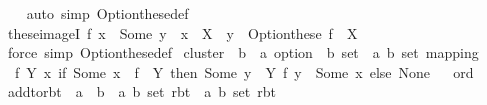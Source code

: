 \begin{isabellebody}
%
\isadelimproof
\ \ %
\endisadelimproof
%
\isatagproof
{}\isamarkupfalse%
\ {\isacharparenleft}{\kern0pt}auto\ simp{\isacharcolon}{\kern0pt}\ Option{\isachardot}{\kern0pt}these{\isacharunderscore}{\kern0pt}def{\isacharparenright}{\kern0pt}%
\endisatagproof
{\isafoldproof}%
%
\isadelimproof
\isanewline
%
\endisadelimproof
\isanewline
{}\isamarkupfalse%
\ these{\isacharunderscore}{\kern0pt}imageI{\isacharcolon}{\kern0pt}\ {\isachardoublequoteopen}f\ x\ {\isacharequal}{\kern0pt}\ Some\ y\ {\isasymLongrightarrow}\ x\ {\isasymin}\ X\ {\isasymLongrightarrow}\ y\ {\isasymin}\ Option{\isachardot}{\kern0pt}these\ {\isacharparenleft}{\kern0pt}f\ {\isacharbackquote}{\kern0pt}\ X{\isacharparenright}{\kern0pt}{\isachardoublequoteclose}\isanewline
%
\isadelimproof
\ \ %
\endisadelimproof
%
\isatagproof
{}\isamarkupfalse%
\ {\isacharparenleft}{\kern0pt}force\ simp{\isacharcolon}{\kern0pt}\ Option{\isachardot}{\kern0pt}these{\isacharunderscore}{\kern0pt}def{\isacharparenright}{\kern0pt}%
\endisatagproof
{\isafoldproof}%
%
\isadelimproof
\isanewline
%
\endisadelimproof
\isanewline
{}\isamarkupfalse%
\ cluster\ {\isacharcolon}{\kern0pt}{\isacharcolon}{\kern0pt}\ {\isachardoublequoteopen}{\isacharparenleft}{\kern0pt}{\isacharprime}{\kern0pt}b\ {\isasymRightarrow}\ {\isacharprime}{\kern0pt}a\ option{\isacharparenright}{\kern0pt}\ {\isasymRightarrow}\ {\isacharprime}{\kern0pt}b\ set\ {\isasymRightarrow}\ {\isacharparenleft}{\kern0pt}{\isacharprime}{\kern0pt}a{\isacharcomma}{\kern0pt}\ {\isacharprime}{\kern0pt}b\ set{\isacharparenright}{\kern0pt}\ mapping{\isachardoublequoteclose}\ \isanewline
\ \ {\isachardoublequoteopen}{\isasymlambda}f\ Y\ x{\isachardot}{\kern0pt}\ if\ Some\ x\ {\isasymin}\ f\ {\isacharbackquote}{\kern0pt}\ Y\ then\ Some\ {\isacharbraceleft}{\kern0pt}y\ {\isasymin}\ Y{\isachardot}{\kern0pt}\ f\ y\ {\isacharequal}{\kern0pt}\ Some\ x{\isacharbraceright}{\kern0pt}\ else\ None{\isachardoublequoteclose}%
\isadelimproof
\ %
\endisadelimproof
%
\isatagproof
\isacommand{{\isachardot}{\kern0pt}}\isamarkupfalse%
%
\endisatagproof
{\isafoldproof}%
%
\isadelimproof
%
\endisadelimproof
\isanewline
\isanewline
{}\isamarkupfalse%
\ ord\isanewline
{}\isanewline
\isanewline
{}\isamarkupfalse%
\ add{\isacharunderscore}{\kern0pt}to{\isacharunderscore}{\kern0pt}rbt\ {\isacharcolon}{\kern0pt}{\isacharcolon}{\kern0pt}\ {\isachardoublequoteopen}{\isacharprime}{\kern0pt}a\ {\isasymtimes}\ {\isacharprime}{\kern0pt}b\ {\isasymRightarrow}\ {\isacharparenleft}{\kern0pt}{\isacharprime}{\kern0pt}a{\isacharcomma}{\kern0pt}\ {\isacharprime}{\kern0pt}b\ set{\isacharparenright}{\kern0pt}\ rbt\ {\isasymRightarrow}\ {\isacharparenleft}{\kern0pt}{\isacharprime}{\kern0pt}a{\isacharcomma}{\kern0pt}\ {\isacharprime}{\kern0pt}b\ set{\isacharparenright}{\kern0pt}\ rbt{\isachardoublequoteclose}\ \isanewline

\end{isabellebody}
